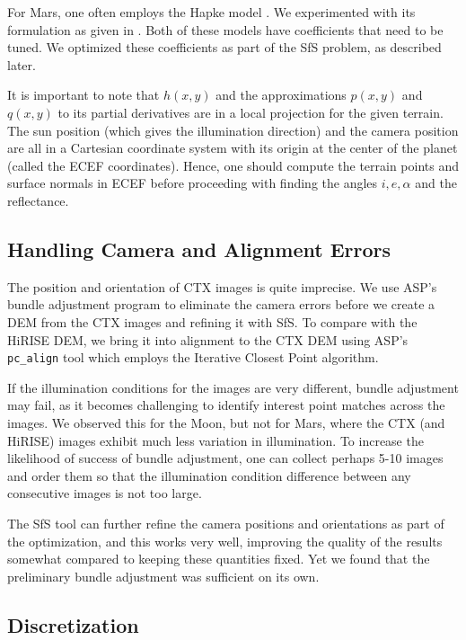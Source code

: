 \documentclass[draft,linenumbers]{agujournal}
\begin{document}
For Mars, one often employs the Hapke model \citet{hapke1993opposition}. We experimented with its formulation as given in \citep{fernando2013surface}. Both of these models have coefficients that need to be tuned. We optimized these coefficients as part of the SfS problem, as described later. 

It is important to note that $h(x, y)$ and the approximations $p(x, y)$ and $q(x,y)$ to its partial
derivatives are in a local projection for the given terrain. The sun position (which gives the 
illumination direction) and the camera position are all in a Cartesian coordinate system with its origin at the center of the planet (called the ECEF coordinates). Hence, one should compute the terrain points and surface normals in ECEF before proceeding with finding the angles $i, e, \alpha$ and the reflectance.  

\subsection{Handling Camera and Alignment Errors}
\label{bundleadjust}

The position and orientation of CTX images is quite imprecise. We use ASP's bundle adjustment program
to eliminate the camera errors before we create a DEM from the CTX images and refining it with SfS. To compare with the HiRISE DEM, we bring it into alignment to the CTX DEM using ASP's \texttt{pc\_align} tool which employs the Iterative Closest Point algorithm. 

If the illumination conditions for the images are very different, bundle adjustment may fail, as it becomes challenging to identify interest point matches across the images. We observed this for the Moon, but not for Mars, where the CTX (and HiRISE) images exhibit much less variation in illumination. To increase the likelihood of success of bundle adjustment, one can collect perhaps 5-10 images and order them so that the illumination condition difference between any consecutive images is not too large.   

The SfS tool can further refine the camera positions and orientations as part of the optimization, and this works very well, improving the quality of the results somewhat compared to keeping these quantities fixed. Yet we found that the preliminary bundle adjustment was sufficient on its own. 

\subsection{Discretization}
\end{document}
